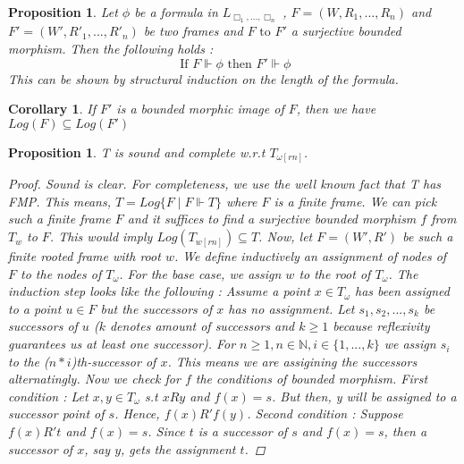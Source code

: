 \documentclass[12pt, a4paper]{scrartcl}
\newtheorem{proposition}[definition]{Proposition}
\newtheorem{corollary}[definition]{Corollary}
\begin{document}
\begin{proposition}
    Let $\phi$ be a formula in $L_{\Box_1,...,\Box_n}$ , $F = (W, R_1,...,R_n)$ and $F' = (W', R'_1,...,R'_n)$ be two frames and $F \mbox{ to } F'$ a surjective bounded morphism. Then the following holds :
    $$ \mbox{ If }F \Vdash \phi \mbox{ then } F' \Vdash \phi$$
    This can be shown by structural induction on the length of the formula.
        
\end{proposition}

\begin{corollary}
    If $F'$ is a bounded morphic image of $F$, then we have $Log(F) \subseteq Log(F')$
    
\end{corollary}

\begin{proposition}
    T is sound and complete w.r.t $T_{\omega[rn]}$.

    \begin{proof}
    Sound is clear. For completeness, we use the well known fact that T has FMP. This means, $T = Log\{F \mid F \Vdash T\}$ where $F$ is a finite frame.
    We can pick such a finite frame $F$ and it suffices to find a surjective bounded morphism $f$ from $T_w$ to $F$. This would imply $Log(T_{w[rn]}) \subseteq T$. \newline
    Now, let $F = (W', R')$ be such a finite rooted frame with root $w$. We define 
    inductively an assignment of nodes of $F$ to the nodes of $T_\omega$. For the base case, we assign $w$ to the root of $T_\omega$. The induction step looks like the following : 
    Assume a point $x \in T_\omega$ has been assigned to a point $u \in F$ but the successors of $x$ has no assignment. 
    Let $s_1, s_2, ..., s_k$ be successors of $u$ ($k$ denotes amount of successors and $k\geq 1$ because reflexivity guarantees us at least one successor).
    For $n \geq 1, n \in \mathbb{N}, i \in\{1,...,k\}$ we assign $s_i$ to the ($n * i$)th-successor of $x$. This means we are assigining the successors alternatingly. \newline
    Now we check for $f$ the conditions of bounded morphism. First condition : Let $x,y \in T_\omega$ s.t $xRy$ and $f(x) = s$. But then, y will be assigned to a successor point of $s$. 
    Hence, $f(x) R'f(y)$. Second condition : Suppose $f(x)R't$ and $f(x) = s$. Since $t$ is a successor of $s$ and $f(x) = s$, then a successor of $x$, say $y$, gets the assignment $t$. 
    
    \end{proof}
        
\end{proposition}
\end{document}
